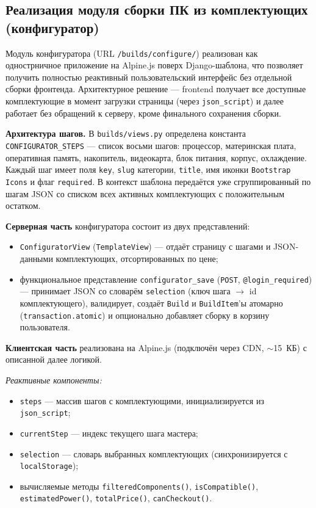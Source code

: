 \documentclass[14pt, a4paper]{extarticle}
\begin{document}
\subsection{Реализация модуля сборки ПК из комплектующих (конфигуратор)}

Модуль конфигуратора (URL \texttt{/builds/configure/}) реализован как однострничное приложение на Alpine.js поверх Django-шаблона, что позволяет получить полностью реактивный пользовательский интерфейс без отдельной сборки фронтенда. Архитектурное решение --- frontend получает все доступные комплектующие в момент загрузки страницы (через \texttt{json\_script}) и далее работает без обращений к серверу, кроме финального сохранения сборки.

\textbf{Архитектура шагов.} В \texttt{builds/views.py} определена константа \texttt{CONFIGURATOR\_STEPS} --- список восьми шагов: процессор, материнская плата, оперативная память, накопитель, видеокарта, блок питания, корпус, охлаждение. Каждый шаг имеет поля \texttt{key}, \texttt{slug} категории, \texttt{title}, имя иконки \texttt{Bootstrap Icons} и флаг \texttt{required}. В контекст шаблона передаётся уже сгруппированный по шагам JSON со списком всех активных комплектующих с положительным остатком.

\textbf{Серверная часть} конфигуратора состоит из двух представлений:
\begin{itemize}
    \item \texttt{ConfiguratorView} (\texttt{TemplateView}) --- отдаёт страницу с шагами и JSON-данными комплектующих, отсортированных по цене;
    \item функциональное представление \texttt{configurator\_save} (\texttt{POST}, \texttt{@login\_required}) --- принимает JSON со словарём \texttt{selection} (ключ шага $\rightarrow$ id комплектующего), валидирует, создаёт \texttt{Build} и \texttt{BuildItem}'ы атомарно (\texttt{transaction.atomic}) и опционально добавляет сборку в корзину пользователя.
\end{itemize}

\textbf{Клиентская часть} реализована на Alpine.js (подключён через CDN, ${\sim}$15~КБ) с описанной далее логикой.

\emph{Реактивные компоненты:}
\begin{itemize}
    \item \texttt{steps} --- массив шагов с комплектующими, инициализируется из \texttt{json\_script};
    \item \texttt{currentStep} --- индекс текущего шага мастера;
    \item \texttt{selection} --- словарь выбранных комплектующих (синхронизируется с \texttt{localStorage});
    \item вычисляемые методы \texttt{filteredComponents()}, \texttt{isCompatible()}, \texttt{estimatedPower()}, \texttt{totalPrice()}, \texttt{canCheckout()}.
\end{itemize}
\end{document}
